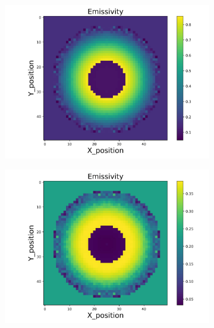 \begin{figure}[p]
\begin{minipage}{\textwidth}
        \begin{subfigure}{0.325\textwidth}
            \centering
            \includegraphics[width=\textwidth]{figures/raw_data/23/lin_square/emi_cal.jpg}
        \end{subfigure}
        \begin{subfigure}{0.325\textwidth}
            \centering
            \includegraphics[width=\textwidth]{figures/raw_data/24/lin_square/emi_cal.jpg}
        \end{subfigure}
    \end{minipage}\\
    \begin{minipage}{\textwidth}

\end{minipage}
\end{figure}
